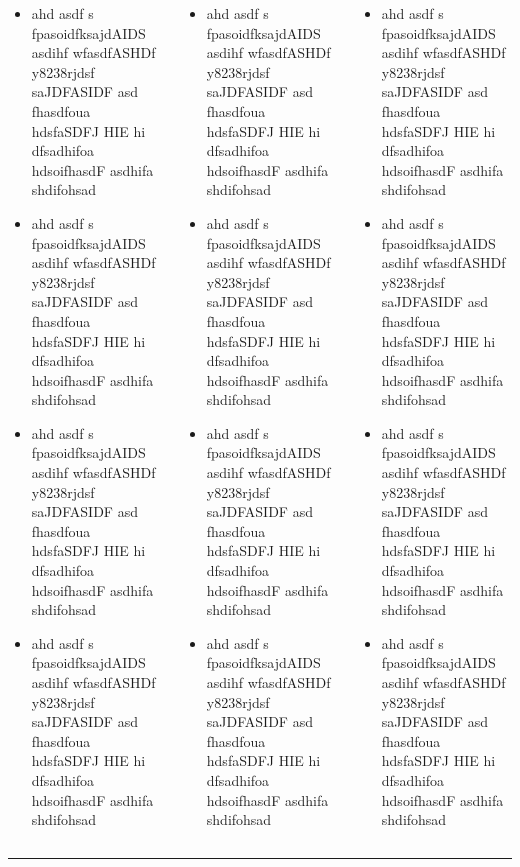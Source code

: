 \documentclass[final]{beamer}
\newlength{\onecolwide}
\begin{document}
\begin{frame}[t]
\begin{columns}[t]
\begin{column}{\onecolwide}
  \begin{itemize}
    \item ahd asdf s fpasoidfksajdAIDS asdihf wfasdfASHDf y8238rjdsf saJDFASIDF asd fhasdfoua hdsfaSDFJ HIE hi dfsadhifoa hdsoifhasdF asdhifa shdifohsad
    \item ahd asdf s fpasoidfksajdAIDS asdihf wfasdfASHDf y8238rjdsf saJDFASIDF asd fhasdfoua hdsfaSDFJ HIE hi dfsadhifoa hdsoifhasdF asdhifa shdifohsad
    \item ahd asdf s fpasoidfksajdAIDS asdihf wfasdfASHDf y8238rjdsf saJDFASIDF asd fhasdfoua hdsfaSDFJ HIE hi dfsadhifoa hdsoifhasdF asdhifa shdifohsad
    \item ahd asdf s fpasoidfksajdAIDS asdihf wfasdfASHDf y8238rjdsf saJDFASIDF asd fhasdfoua hdsfaSDFJ HIE hi dfsadhifoa hdsoifhasdF asdhifa shdifohsad
  \end{itemize}
\end{column}
\begin{column}{\onecolwide}
  \begin{itemize}
    \item ahd asdf s fpasoidfksajdAIDS asdihf wfasdfASHDf y8238rjdsf saJDFASIDF asd fhasdfoua hdsfaSDFJ HIE hi dfsadhifoa hdsoifhasdF asdhifa shdifohsad
    \item ahd asdf s fpasoidfksajdAIDS asdihf wfasdfASHDf y8238rjdsf saJDFASIDF asd fhasdfoua hdsfaSDFJ HIE hi dfsadhifoa hdsoifhasdF asdhifa shdifohsad
    \item ahd asdf s fpasoidfksajdAIDS asdihf wfasdfASHDf y8238rjdsf saJDFASIDF asd fhasdfoua hdsfaSDFJ HIE hi dfsadhifoa hdsoifhasdF asdhifa shdifohsad
    \item ahd asdf s fpasoidfksajdAIDS asdihf wfasdfASHDf y8238rjdsf saJDFASIDF asd fhasdfoua hdsfaSDFJ HIE hi dfsadhifoa hdsoifhasdF asdhifa shdifohsad
  \end{itemize}
\end{column}
\begin{column}{\onecolwide}
  \begin{itemize}
    \item ahd asdf s fpasoidfksajdAIDS asdihf wfasdfASHDf y8238rjdsf saJDFASIDF asd fhasdfoua hdsfaSDFJ HIE hi dfsadhifoa hdsoifhasdF asdhifa shdifohsad
    \item ahd asdf s fpasoidfksajdAIDS asdihf wfasdfASHDf y8238rjdsf saJDFASIDF asd fhasdfoua hdsfaSDFJ HIE hi dfsadhifoa hdsoifhasdF asdhifa shdifohsad
    \item ahd asdf s fpasoidfksajdAIDS asdihf wfasdfASHDf y8238rjdsf saJDFASIDF asd fhasdfoua hdsfaSDFJ HIE hi dfsadhifoa hdsoifhasdF asdhifa shdifohsad
    \item ahd asdf s fpasoidfksajdAIDS asdihf wfasdfASHDf y8238rjdsf saJDFASIDF asd fhasdfoua hdsfaSDFJ HIE hi dfsadhifoa hdsoifhasdF asdhifa shdifohsad
  \end{itemize}
\end{column}
\end{columns} %
\vspace{5mm}
\hrule


\end{frame} %
\end{document}
